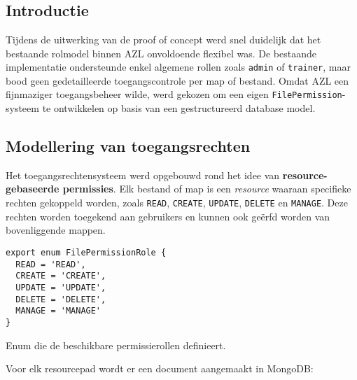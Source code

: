 
\chapter{}
\label{ch:proof-of-concept}

\section{Introductie}

Tijdens de uitwerking van de proof of concept werd snel duidelijk dat het bestaande rolmodel binnen AZL onvoldoende flexibel was. De bestaande implementatie ondersteunde enkel algemene rollen zoals \texttt{admin} of \texttt{trainer}, maar bood geen gedetailleerde toegangscontrole per map of bestand. Omdat AZL een fijnmaziger toegangsbeheer wilde, werd gekozen om een eigen \texttt{FilePermission}-systeem te ontwikkelen op basis van een gestructureerd database model.

\section{Modellering van toegangsrechten}

Het toegangsrechtensysteem werd opgebouwd rond het idee van \textbf{resource-gebaseerde permissies}. Elk bestand of map is een \emph{resource} waaraan specifieke rechten gekoppeld worden, zoals \texttt{READ}, \texttt{CREATE}, \texttt{UPDATE}, \texttt{DELETE} en \texttt{MANAGE}. Deze rechten worden toegekend aan gebruikers en kunnen ook geërfd worden van bovenliggende mappen.

\begin{listing}[H]
\begin{verbatim}
export enum FilePermissionRole {
  READ = 'READ',
  CREATE = 'CREATE',
  UPDATE = 'UPDATE',
  DELETE = 'DELETE',
  MANAGE = 'MANAGE'
}
\end{verbatim}
\caption[Permissierollen per bestand of map]{Enum die de beschikbare permissierollen definieert.}
\end{listing}

Voor elk resourcepad wordt er een document aangemaakt in MongoDB:


